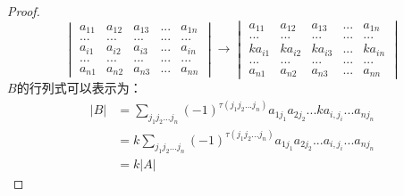 \documentclass[blue,normal,cn]{elegantnote}
\begin{document}
\begin{proof}
    \begin{equation*}
        \begin{vmatrix} 
            a_{11}&a_{12} & a_{13} &...& a_{1n}\\
            ...&...&...&...&...\\
            a_{i1}&a_{i2} & a_{i3} &...& a_{in}\\
            ...&...&...&...&...\\
            a_{n1}&a_{n2} & a_{n3} &...& a_{nn}
        \end{vmatrix}
        \longrightarrow
        \begin{vmatrix} 
            a_{11}&a_{12} & a_{13} &...& a_{1n}\\
            ...&...&...&...&...\\
            ka_{i1}& ka_{i2} & ka_{i3} &...& ka_{in}\\
            ...&...&...&...&...\\
            a_{n1}&a_{n2} & a_{n3} &...& a_{nn}
        \end{vmatrix}
    \end{equation*}
$B$的行列式可以表示为：
\begin{equation*}
    \begin{aligned}
        |B|&=\sum_{j_1j_2...j_n}(-1)^{\tau(j_1 j_2...j_n)}a_{1 j_1}a_{2 j_2}...ka_{i,j_i}...a_{n j_n}\\
           &=k\sum_{j_1j_2...j_n}(-1)^{\tau(j_1 j_2...j_n)}a_{1 j_1}a_{2 j_2}...a_{i,j_i}...a_{n j_n}\\
           &=k|A|
    \end{aligned}
\end{equation*}
\end{proof}
\end{document}
